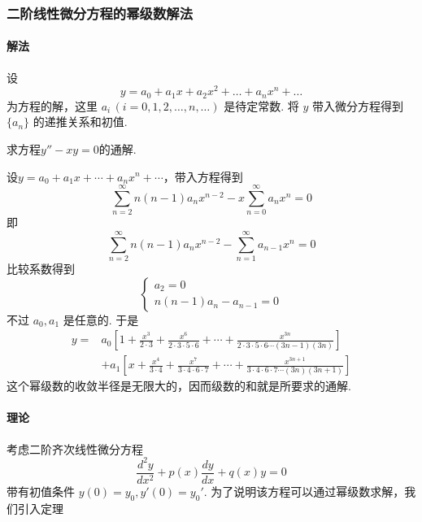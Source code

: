 \subsubsection{二阶线性微分方程的幂级数解法}

\paragraph{解法}
设
$$
    y=a_{0}+a_{1}x+a_{2}x^{2}+\dots+a_{n}x^{n}+\dots
$$
为方程的解，这里 $\displaystyle a_{i}\,(i=0,1,2,\dots,n,\dots)$ 是待定常数. 将 $\displaystyle y$ 带入微分方程得到 $\displaystyle \{ a_{n} \}$ 的递推关系和初值.

\begin{exercise}
    求方程$y''-xy=0$的通解.
\end{exercise}

\begin{solution}
    设$y=a_0+a_1x+\cdots+a_nx^n+\cdots$，带入方程得到
    $$
        \sum_{n=2}^{\infty}n(n-1)a_nx^{n-2}-x\sum_{n=0}^{\infty}a_nx^n=0
    $$
    即
    $$
        \sum_{n=2}^{\infty}n(n-1)a_nx^{n-2}-\sum_{n=1}^{\infty}a_{n-1}x^n=0
    $$
    比较系数得到
    $$
        \begin{cases}
            a_2=0 \\
            n(n-1)a_n-a_{n-1}=0
        \end{cases}
    $$
    不过 $a_0,a_1$ 是任意的. 于是
    \begin{align*}
        y= & a_0\left[1+\frac{x^3}{2\cdot 3}+\frac{x^6}{2\cdot 3\cdot 5\cdot 6}+\cdots+\frac{x^{3n}}{2\cdot 3\cdot 5\cdot 6\cdots(3n-1)(3n)}\right]    \\
           & +a_1\left[x+\frac{x^4}{3\cdot 4}+\frac{x^7}{3\cdot 4\cdot 6\cdot 7}+\cdots+\frac{x^{3n+1}}{3\cdot 4\cdot 6\cdot 7\cdots(3n)(3n+1)}\right]
    \end{align*}
    这个幂级数的收敛半径是无限大的，因而级数的和就是所要求的通解.
\end{solution}

\paragraph{理论}
考虑二阶齐次线性微分方程
\begin{equation}
    \frac{d^{2}y}{dx^{2}}+p(x)\frac{dy}{dx}+q(x)y=0
    \label{eq:4.72}
\end{equation}
带有初值条件 $\displaystyle y(0)=y_{0},y'(0)=y_{0}'$. 为了说明该方程可以通过幂级数求解，我们引入定理


